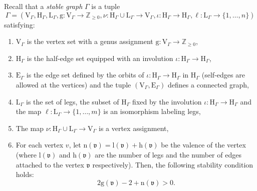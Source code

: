 \documentclass[12pt]{amsart}
\numberwithin{equation}{section}
\begin{document}
Recall that a \textit{stable graph} $\Gamma$ is a tuple
\begin{equation*}
\Gamma=\left(\mathrm{V}_{\Gamma}, \mathrm{H}_{\Gamma}, \mathrm{L}_{\Gamma}, \mathrm{g}: \mathrm{V}_{\Gamma} \rightarrow \mathbb{Z}_{\geq 0}, \nu: \mathrm{H}_{\Gamma}\cup\mathrm{L}_{\Gamma} \rightarrow \mathrm{V}_{\Gamma}, \iota: \mathrm{H}_{\Gamma} \rightarrow \mathrm{H}_{\Gamma}, \ell:\mathrm{L}_{\Gamma}\rightarrow\{1,\ldots,n\} \right)
\end{equation*}
satisfying:
\begin{enumerate}
\item $\mathrm{V}_{\Gamma}$ is the vertex set with a genus assignment $\mathrm{g}:\mathrm{V}_{\Gamma}\rightarrow\mathbb{Z}_{\geq 0}$,
    
\item $\mathrm{H}_{\Gamma}$ is the half-edge set equipped with an involution $\iota: \mathrm{H}_{\Gamma} \rightarrow \mathrm{H}_{\Gamma}$,
    
\item $\mathrm{E}_{\Gamma}$ is the edge set defined by the orbits of $\iota: \mathrm{H}_{\Gamma} \rightarrow \mathrm{H}_{\Gamma}$ 
in $\mathrm{H}_{\Gamma}$ (self-edges are allowed at the vertices) and the tuple $\left(\mathrm{V}_{\Gamma},\mathrm{E}_{\Gamma}\right)$ defines a connected graph,
    
\item $\mathrm{L}_{\Gamma}$ is the set of legs, the subset of $\mathrm{H}_{\Gamma}$ fixed by the involution $\iota: \mathrm{H}_{\Gamma} \rightarrow \mathrm{H}_{\Gamma}$ and the map $\ell:\mathrm{L}_{\Gamma}\rightarrow\{1,\ldots,m\}$ is an isomorphism labeling legs,

\item The map $\nu: \mathrm{H}_{\Gamma}\cup\mathrm{L}_{\Gamma} \rightarrow \mathrm{V}_{\Gamma}$ is a vertex assignment,
    
\item For each vertex $v$, let $\mathrm{n}(\mathfrak{v})=\mathrm{l}(\mathfrak{v})+\mathrm{h}(\mathfrak{v})$ be the valence of the vertex (where $\mathrm{l}(\mathfrak{v})$ and $\mathrm{h}(\mathfrak{v})$ are the number of legs and the number of edges attached to the vertex $\mathfrak{v}$ respectively). Then, the following stability condition holds:
\begin{equation*}
2\mathrm{g}(\mathfrak{v})-2+\mathrm{n}(\mathfrak{v})>0.
\end{equation*}
\end{enumerate}
\end{document}
